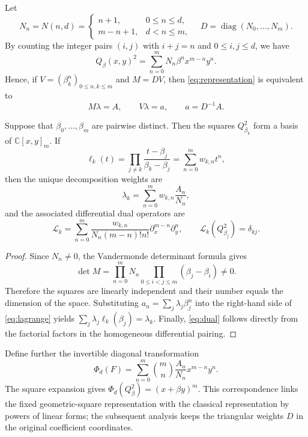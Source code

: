 \documentclass[10pt,twoside,final]{siamart1116}
\numberwithin{equation}{section}
\numberwithin{theorem}{section}
\newcommand{\C}{\mathbb C}
\newcommand{\diag}{\operatorname{diag}}
\begin{document}
Let
\begin{equation}\label{eq:N}
N_n=N(n,d)=\begin{cases}n+1,&0\le n\le d,\\m-n+1,&d<n\le m,\end{cases}
\quad D=\diag(N_0,\ldots,N_m).
\end{equation}
By counting the integer pairs $(i,j)$ with $i+j=n$ and $0\le i,j\le d$, we have
\begin{equation}\label{eq:square}
Q_\beta(x,y)^2=\sum_{n=0}^{m}N_n\beta^n x^{m-n}y^n.
\end{equation}
Hence, if $V=(\beta_k^n)_{0\le n,k\le m}$ and $M=DV$, then
\eqref{eq:representation} is equivalent to
\begin{equation}\label{eq:system}
M\lambda=A,\qquad V\lambda=a,\qquad a=D^{-1}A.
\end{equation}

\begin{theorem}\label{thm:basis}
Suppose that $\beta_0,\ldots,\beta_m$ are pairwise distinct. Then the squares
$Q_{\beta_k}^2$ form a basis of $\C[x,y]_m$. If
\[
\ell_k(t)=\prod_{j\ne k}\frac{t-\beta_j}{\beta_k-\beta_j}
=\sum_{n=0}^{m}w_{k,n}t^n,
\]
then the unique decomposition weights are
\begin{equation}\label{eq:lagrange}
\lambda_k=\sum_{n=0}^{m}w_{k,n}\frac{A_n}{N_n},
\end{equation}
and the associated differential dual operators are
\begin{equation}\label{eq:dual}
\mathcal L_k=\sum_{n=0}^{m}\frac{w_{k,n}}{N_n(m-n)!n!}
\partial_x^{m-n}\partial_y^n,
\qquad \mathcal L_k(Q_{\beta_j}^2)=\delta_{kj}.
\end{equation}
\end{theorem}
\begin{proof}
Since $N_n\ne0$, the Vandermonde determinant formula gives
\[
\det M=\prod_{n=0}^{m}N_n\prod_{0\le i<j\le m}(\beta_j-\beta_i)\ne0.
\]
Therefore the squares are linearly independent and their number equals the dimension of
the space. Substituting $a_n=\sum_j\lambda_j\beta_j^n$ into the right-hand side of
\eqref{eq:lagrange} yields $\sum_j\lambda_j\ell_k(\beta_j)=\lambda_k$. Finally,
\eqref{eq:dual} follows directly from the factorial factors in the homogeneous
differential pairing.
\end{proof}

Define further the invertible diagonal transformation
\begin{equation}\label{eq:Phi}
\Phi_d(F)=\sum_{n=0}^{m}\binom{m}{n}\frac{A_n}{N_n}x^{m-n}y^n.
\end{equation}
The square expansion gives $\Phi_d(Q_\beta^2)=(x+\beta y)^m$. This correspondence links
the fixed geometric-square representation with the classical representation by powers of
linear forms; the subsequent analysis keeps the triangular weights $D$ in the original
coefficient coordinates.
\end{document}
